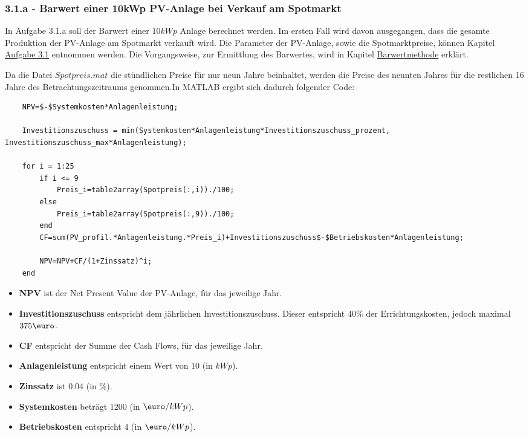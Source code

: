\documentclass[a4paper,12pt]{article}
\begin{document}
	\subsubsection{3.1.a - Barwert einer 10kWp PV-Anlage bei Verkauf am Spotmarkt}
	In Aufgabe 3.1.a soll der Barwert einer $10kWp$ Anlage berechnet werden. Im ersten Fall wird davon ausgegangen, dass die gesamte Produktion der PV-Anlage am Spotmarkt verkauft wird. Die Parameter der PV-Anlage, sowie die Spotmarktpreise, können Kapitel \hyperref[sec:Aufgabenstellung31]{Aufgabe 3.1} entnommen werden.\newline
	Die Vorgangsweise, zur Ermittlung des Barwertes, wird in Kapitel \hyperref[sec:BerechnungenBarwertmethode]{Barwertmethode} erklärt.\\ \par
	\noindent Da die Datei $Spotpreis.mat$ die stündlichen Preise für nur neun Jahre beinhaltet, werden die Preise des neunten Jahres für die restlichen 16 Jahre des Betrachtungszeitraums genommen.\newline In MATLAB ergibt sich dadurch folgender Code:
	\begin{lstlisting}
	NPV=$-$Systemkosten*Anlagenleistung;

	Investitionszuschuss = min(Systemkosten*Anlagenleistung*Investitionszuschuss_prozent, Investitionszuschuss_max*Anlagenleistung);
	
	for i = 1:25
		if i <= 9
			Preis_i=table2array(Spotpreis(:,i))./100;
		else
			Preis_i=table2array(Spotpreis(:,9))./100;
		end
		CF=sum(PV_profil.*Anlagenleistung.*Preis_i)+Investitionszuschuss$-$Betriebskosten*Anlagenleistung;
	
		NPV=NPV+CF/(1+Zinssatz)^i;
	end
	\end{lstlisting}
	\begin{itemize}
		\item \textbf{NPV} ist der Net Present Value der PV-Anlage, für das jeweilige Jahr.
		\item \textbf{Investitionszuschuss} entspricht dem jährlichen Investitionszuschuss. Dieser entspricht $40\%$ der Errichtungskosten, jedoch maximal $375\mbox{\euro}$.
		\item \textbf{CF} entspricht der Summe der Cash Flows, für das jeweilige Jahr.
		\item \textbf{Anlagenleistung} entspricht einem Wert von $10$ (in $kWp$).
		\item \textbf{Zinssatz} ist $0.04$ (in \%).
		\item \textbf{Systemkosten} beträgt $1200$ (in $\mbox{\euro}/kWp$).
		\item \textbf{Betriebskosten} entspricht $4$ (in $\mbox{\euro}/kWp$).
	\end{itemize}
\end{document}
